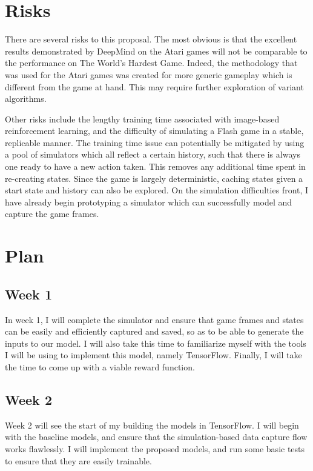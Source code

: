 \documentclass[preprint,12pt]{elsarticle}
\begin{document}
\section{Risks}

There are several risks to this proposal. The most obvious is that the excellent results demonstrated by DeepMind on the Atari games will not be comparable to the performance on The World's Hardest Game. Indeed, the methodology that was used for the Atari games was created for more generic gameplay which is different from the game at hand. This may require further exploration of variant algorithms.

Other risks include the lengthy training time associated with image-based reinforcement learning, and the difficulty of simulating a Flash game in a stable, replicable manner. The training time issue can potentially be mitigated by using a pool of simulators which all reflect a certain history, such that there is always one ready to have a new action taken. This removes any additional time spent in re-creating states. Since the game is largely deterministic, caching states given a start state and history can also be explored. On the simulation difficulties front, I have already begin prototyping a simulator which can successfully model and capture the game frames.

\section{Plan}

\subsection*{Week 1}

In week 1, I will complete the simulator and ensure that game frames and states can be easily and efficiently captured and saved, so as to be able to generate the inputs to our model. I will also take this time to familiarize myself with the tools I will be using to implement this model, namely TensorFlow. Finally, I will take the time to come up with a viable reward function.

\subsection*{Week 2}

Week 2 will see the start of my building the models in TensorFlow. I will begin with the baseline models, and ensure that the simulation-based data capture flow works flawlessly. I will implement the proposed models, and run some basic tests to ensure that they are easily trainable.
\end{document}
